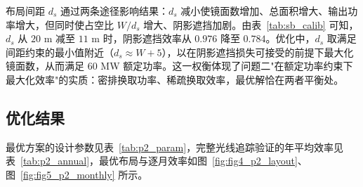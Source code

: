 \documentclass[12pt]{ctexart}
\begin{document}
\begin{table}[H]
\centering
{}
\caption{定日镜宽度对输出功率与单位面积功率的影响（塔位于圆心）}
\label{tab:p2_Wsens}
\end{table}

布局间距 $d_s$ 通过两条途径影响结果：$d_s$ 减小使镜面数增加、总面积增大、输出功率增大，但同时使占空比 $W/d_s$ 增大、阴影遮挡加剧。由表~\ref{tab:sb_calib} 可知，$d_s$ 从 $20$ m 减至 $11$ m 时，阴影遮挡效率从 $0.976$ 降至 $0.784$。优化中，$d_s$ 取满足间距约束的最小值附近（$d_s\approx W+5$），以在阴影遮挡损失可接受的前提下最大化镜面数，从而满足 $60$ MW 额定功率。这一权衡体现了问题二"在额定功率约束下最大化效率"的实质：密排换取功率、稀疏换取效率，最优解恰在两者平衡处。

\subsection{优化结果}
最优方案的设计参数见表~\ref{tab:p2_param}，完整光线追踪验证的年平均效率见表~\ref{tab:p2_annual}，最优布局与逐月效率如图~\ref{fig:fig4_p2_layout}、图~\ref{fig:fig5_p2_monthly} 所示。

\begin{table}[H]
\centering
{}
\caption{问题二设计参数表}
\label{tab:p2_param}
\end{table}

\begin{table}[H]
\centering
{}
\caption{问题二年平均光学效率及输出功率表}
\label{tab:p2_annual}
\end{table}
\end{document}
